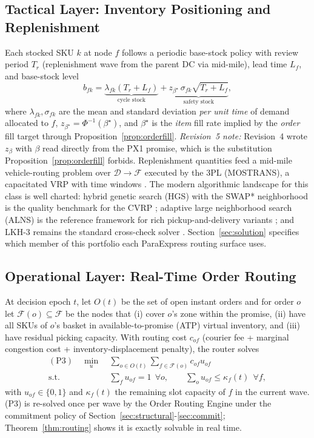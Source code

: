 \subsection{Tactical Layer: Inventory Positioning and Replenishment}

Each stocked SKU $k$ at node $f$ follows a periodic base-stock policy with review period $T_r$ (replenishment wave from the parent DC via mid-mile), lead time $L_f$, and base-stock level
\begin{equation}\label{eq:basestock}
b_{fk}=\underbrace{\lambda_{fk}(T_r+L_f)}_{\text{cycle stock}}+\underbrace{z_{\beta^\star}\,\sigma_{fk}\sqrt{T_r+L_f}}_{\text{safety stock}},
\end{equation}
where $\lambda_{fk},\sigma_{fk}$ are the mean and standard deviation \emph{per unit time} of demand allocated to $f$, $z_{\beta^\star}=\Phi^{-1}(\beta^\star)$, and $\beta^\star$ is the \emph{item} fill rate implied by the \emph{order} fill target through Proposition~\ref{prop:orderfill}. \emph{Revision~5 note:} Revision~4 wrote $z_\beta$ with $\beta$ read directly from the PX1 promise, which is the substitution Proposition~\ref{prop:orderfill} forbids. Replenishment quantities feed a mid-mile vehicle-routing problem over $\mathcal{D}\to\mathcal{F}$ executed by the 3PL (MOSTRANS), a capacitated VRP with time windows \cite{toth2014}. The modern algorithmic landscape for this class is well charted: hybrid genetic search (HGS) with the SWAP* neighborhood is the quality benchmark for the CVRP \cite{vidal2022,wouda2024}; adaptive large neighborhood search (ALNS) is the reference framework for rich pickup-and-delivery variants \cite{ropke2006,voigt2025}; and LKH-3 remains the standard cross-check solver \cite{helsgaun2017}. Section~\ref{sec:solution} specifies which member of this portfolio each ParaExpress routing surface uses.

\subsection{Operational Layer: Real-Time Order Routing}

At decision epoch $t$, let $O(t)$ be the set of open instant orders and for order $o$ let $\mathcal{F}(o)\subseteq\mathcal{F}$ be the nodes that (i) cover $o$'s zone within the promise, (ii) have all SKUs of $o$'s basket in available-to-promise (ATP) virtual inventory, and (iii) have residual picking capacity. With routing cost $c_{of}$ (courier fee + marginal congestion cost + inventory-displacement penalty), the router solves
\begin{align}
(\mathrm{P3})\quad\min_u\ &\sum_{o\in O(t)}\sum_{f\in\mathcal{F}(o)}c_{of}u_{of}\label{eq:p3}\\
\text{s.t.}\ &\textstyle\sum_f u_{of}=1\ \ \forall o,\qquad \sum_o u_{of}\le\kappa_f(t)\ \ \forall f,\nonumber
\end{align}
with $u_{of}\in\{0,1\}$ and $\kappa_f(t)$ the remaining slot capacity of $f$ in the current wave. (P3) is re-solved once per wave by the Order Routing Engine under the commitment policy of Section~\ref{sec:structural}-\ref{sec:commit}; Theorem~\ref{thm:routing} shows it is exactly solvable in real time.

